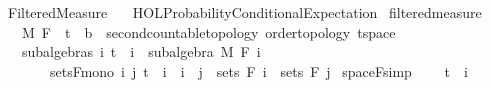 %
\begin{isabellebody}%
%
%
\isadelimtheory
\isanewline
\isanewline
%
\endisadelimtheory
%
\isatagtheory
{}\isamarkupfalse%
\ Filtered{\isacharunderscore}{\kern0pt}Measure\isanewline
\ \ \ {\isachardoublequoteopen}HOL{\isacharminus}{\kern0pt}Probability{\isachardot}{\kern0pt}Conditional{\isacharunderscore}{\kern0pt}Expectation{\isachardoublequoteclose}\isanewline
{}%
\endisatagtheory
{\isafoldtheory}%
%
\isadelimtheory
%
\endisadelimtheory
%
\isadelimdocument
%
\endisadelimdocument
%
\isatagdocument
%
\isamarkuptrue%
%
\isamarkuptrue%
%
\endisatagdocument
{\isafolddocument}%
%
\isadelimdocument
%
\endisadelimdocument
{}\isamarkupfalse%
\ filtered{\isacharunderscore}{\kern0pt}measure\ {\isacharequal}{\kern0pt}\ \isanewline
\ \ \ M\ F\ \ t\ {\isacharcolon}{\kern0pt}{\isacharcolon}{\kern0pt}\ {\isachardoublequoteopen}{\isacharprime}{\kern0pt}b\ {\isacharcolon}{\kern0pt}{\isacharcolon}{\kern0pt}\ {\isacharbraceleft}{\kern0pt}second{\isacharunderscore}{\kern0pt}countable{\isacharunderscore}{\kern0pt}topology{\isacharcomma}{\kern0pt}\ order{\isacharunderscore}{\kern0pt}topology{\isacharcomma}{\kern0pt}\ t{}{\isacharunderscore}{\kern0pt}space{\isacharbraceright}{\kern0pt}{\isachardoublequoteclose}\isanewline
\ \ \ subalgebras{\isacharcolon}{\kern0pt}\ {\isachardoublequoteopen}{\isasymAnd}i{\isachardot}{\kern0pt}\ t\ {\isasymle}\ i\ {\isasymLongrightarrow}\ subalgebra\ M\ {\isacharparenleft}{\kern0pt}F\ i{\isacharparenright}{\kern0pt}{\isachardoublequoteclose}\isanewline
\ \ \ \ \ \ \ sets{\isacharunderscore}{\kern0pt}F{\isacharunderscore}{\kern0pt}mono{\isacharcolon}{\kern0pt}\ {\isachardoublequoteopen}{\isasymAnd}i\ j{\isachardot}{\kern0pt}\ t\ {\isasymle}\ i\ {\isasymLongrightarrow}\ i\ {\isasymle}\ j\ {\isasymLongrightarrow}\ sets\ {\isacharparenleft}{\kern0pt}F\ i{\isacharparenright}{\kern0pt}\ {\isasymle}\ sets\ {\isacharparenleft}{\kern0pt}F\ j{\isacharparenright}{\kern0pt}{\isachardoublequoteclose}\isanewline
{}\isanewline
\isanewline
{}\isamarkupfalse%
\ space{\isacharunderscore}{\kern0pt}F{\isacharbrackleft}{\kern0pt}simp{\isacharbrackright}{\kern0pt}{\isacharcolon}{\kern0pt}\ \isanewline
\ \ \ {\isachardoublequoteopen}t\ {\isasymle}\ i{\isachardoublequoteclose}\isanewline

\end{isabellebody}
